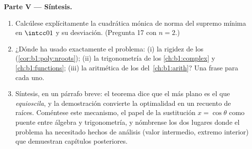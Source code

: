 \begin{problem}
\medskip
\noindent\textbf{Parte V --- Síntesis.}
\begin{enumerate}[resume]
  \item Calcúlese explícitamente la cuadrática mónica de norma del
        supremo mínima en $\intcc01$ y su desviación. (Pregunta 17 con
        $n = 2$.)
  \item ¿Dónde ha usado exactamente el problema: (i) la rigidez de los
         (\cref{cor:b1:poly:nroots}); (ii) la trigonometría
        de los \cref{ch:b1:complex} y \cref{ch:b1:functions}; (iii) la
        aritmética de los 
        del~\cref{ch:b1:arith}? Una frase para cada uno.
  \item Síntesis, en un párrafo breve: el teorema dice que el
         más plano es el que \emph{equioscila}, y la
        demostración convierte la optimalidad en un recuento de
        raíces. Coméntese este mecanismo, el papel de la sustitución
        $x = \cos\theta$ como puente entre álgebra y trigonometría, y
        nómbrense los dos lugares donde el problema ha necesitado
        hechos de análisis (valor intermedio, extremo interior) que
        demuestran capítulos posteriores.
\end{enumerate}
\end{problem}
